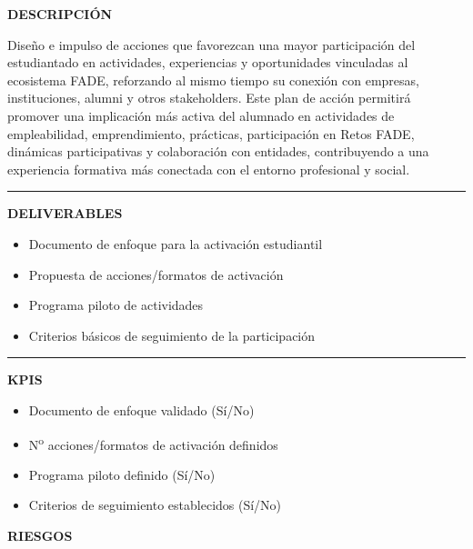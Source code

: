\documentclass[11pt,a4paper]{scrreprt}
\newcommand{\fieldlabel}[1]{%
  {\footnotesize\sffamily\bfseries\color{mutedcolor}\MakeUppercase{#1}}\par\nopagebreak[4]
}
\newcommand{\fieldsep}{\vspace{3pt}\noindent\textcolor{bordercolor}{\rule{\linewidth}{0.4pt}}\vspace{3pt}\par}
\begin{document}
\begin{tcolorbox}[pabox={filcolor}{PA2.2 \enspace\textbullet\enspace Impulso de la participación y conexión del estudiantado con el ecosistema FADE y su entorno}]

\fieldlabel{Descripci\'on}
{\small Diseño e impulso de acciones que favorezcan una mayor participación del estudiantado en actividades, experiencias y oportunidades vinculadas al ecosistema FADE, reforzando al mismo tiempo su conexión con empresas, instituciones, alumni y otros stakeholders. Este plan de acción permitirá promover una implicación más activa del alumnado en actividades de empleabilidad, emprendimiento, prácticas, participación en Retos FADE, dinámicas participativas y colaboración con entidades, contribuyendo a una experiencia formativa más conectada con el entorno profesional y social. }\par
\fieldsep
\fieldlabel{Deliverables}
{\small \begin{itemize}[noitemsep,topsep=2pt]
\item Documento de enfoque para la activación estudiantil
\item Propuesta de acciones/formatos de activación
\item Programa piloto de actividades
\item Criterios básicos de seguimiento de la participación
\end{itemize}}\par
\fieldsep
\fieldlabel{KPIs}
{\small \begin{itemize}[noitemsep,topsep=2pt]
\item Documento de enfoque validado (Sí/No)
\item N\textsuperscript{o} acciones/formatos de activación definidos
\item Programa piloto definido (Sí/No)
\item Criterios de seguimiento establecidos (Sí/No)
\end{itemize}}\par
\end{tcolorbox}
\begin{tcolorbox}[riskbox]
{\footnotesize\sffamily\bfseries\color{red!50!black} RIESGOS}\par{}
\end{tcolorbox}
\end{document}
